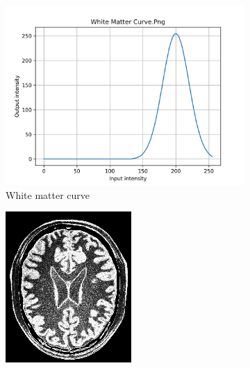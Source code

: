 \documentclass[10pt,a4paper]{article}
\begin{document}
\begin{figure}[H]
    \centering
    \begin{subfigure}{0.24\textwidth}
        \includegraphics[width=\textwidth]{task2/white_matter_curve.png}
        \caption{White matter curve}
    \end{subfigure}
    \begin{subfigure}{0.24\textwidth}
        \includegraphics[width=\textwidth]{task2/white_matter.png}

\end{subfigure}
\end{figure}
\end{document}

